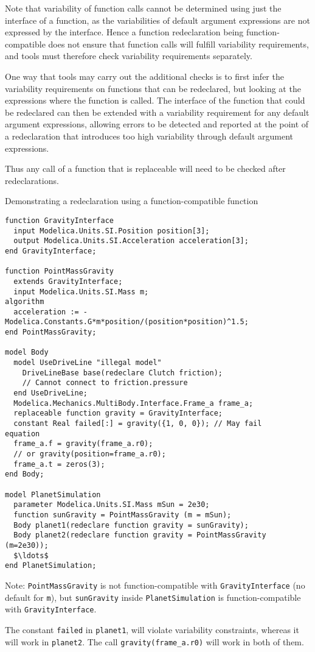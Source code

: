 Note that variability of function calls cannot be determined using just the interface of a function, as the variabilities of default argument expressions are not expressed by the interface.
Hence a function redeclaration being function-compatible does not ensure that function calls will fulfill variability requirements, and tools must therefore check variability requirements separately.

\begin{nonnormative}
One way that tools may carry out the additional checks is to first infer the variability requirements on functions that can be redeclared, but looking at the expressions where the function is called.
The interface of the function that could be redeclared can then be extended with a variability requirement for any default argument expressions, allowing errors to be detected and reported at the point of a redeclaration that introduces too high variability through default argument expressions.
\end{nonnormative}
\begin{nonnormative}
Thus any call of a function that is replaceable will need to be checked after redeclarations.
\end{nonnormative}

\begin{example}
Demonstrating a redeclaration using a function-compatible function
\begin{lstlisting}[language=modelica]
function GravityInterface
  input Modelica.Units.SI.Position position[3];
  output Modelica.Units.SI.Acceleration acceleration[3];
end GravityInterface;

function PointMassGravity
  extends GravityInterface;
  input Modelica.Units.SI.Mass m;
algorithm
  acceleration := -Modelica.Constants.G*m*position/(position*position)^1.5;
end PointMassGravity;

model Body
  model UseDriveLine "illegal model"
    DriveLineBase base(redeclare Clutch friction);
    // Cannot connect to friction.pressure
  end UseDriveLine;
  Modelica.Mechanics.MultiBody.Interface.Frame_a frame_a;
  replaceable function gravity = GravityInterface;
  constant Real failed[:] = gravity({1, 0, 0}); // May fail
equation
  frame_a.f = gravity(frame_a.r0);
  // or gravity(position=frame_a.r0);
  frame_a.t = zeros(3);
end Body;

model PlanetSimulation
  parameter Modelica.Units.SI.Mass mSun = 2e30;
  function sunGravity = PointMassGravity (m = mSun);
  Body planet1(redeclare function gravity = sunGravity);
  Body planet2(redeclare function gravity = PointMassGravity (m=2e30));
  $\ldots$
end PlanetSimulation;
\end{lstlisting}

Note: \lstinline!PointMassGravity! is not function-compatible with
\lstinline!GravityInterface! (no default for \lstinline!m!), but \lstinline!sunGravity!
inside \lstinline!PlanetSimulation! is function-compatible with
\lstinline!GravityInterface!.

The constant \lstinline!failed! in \lstinline!planet1!, will violate variability constraints, whereas it will work in \lstinline!planet2!.
The call \lstinline!gravity(frame_a.r0)! will work in both of them.
\end{example}

